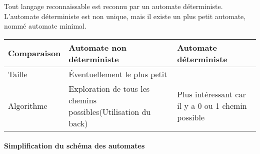 
Tout langage reconnaissable est reconnu par un automate déterministe. L'automate déterministe est non unique, mais il existe un plus petit automate, nommé automate minimal.

\begin{center}
	\begin{tabular}{ | l | p{5cm} | p{5cm} |}
		\hline
		Comparaison & Automate non déterministe & Automate déterministe\\
		\hline
		Taille & Éventuellement le plus petit & \\
		\hline
		Algorithme & Exploration de tous les chemins possibles(Utilisation du back) & Plus intéressant car il y a 0 ou 1 chemin possible\\
		\hline
	\end{tabular}
\end{center}


\paragraph{Simplification du schéma des automates} %
\label{par:simplification_du_sch_ma_des_automates}

